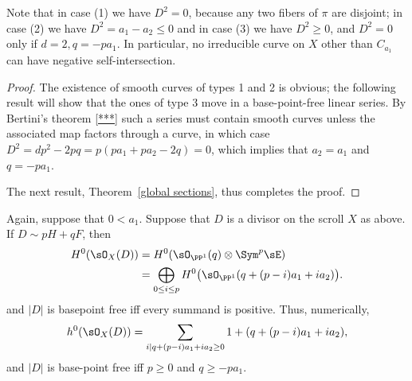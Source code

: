 Note that in case (1) we have $D^{2} = 0$, because any two fibers of $\pi$ are disjoint; in case (2) we have $D^{2}= a_{1}-a_{2}\leq 0$ and in case (3) we have $D^{2}\geq 0$, and $D^2=0$ only if
$d=2, q = -pa_1$. In particular, no irreducible curve
on $X$ other than $C_{a_1}$ can have negative self-intersection.

\begin{proof}
The existence of smooth curves of types 1 and 2 is obvious; the following result will show that
the ones of type 3 move in a base-point-free linear series. By Bertini's theorem \ref{***} such a series must contain smooth curves unless the associated map factors through a curve, in which case $D^2 = dp^2-2pq = p(pa_1+pa_2 -2 q) = 0$, which implies that $a_2=a_1$ and $q= -pa_1$.

The next result, Theorem~\ref{global sections}, thus completes the proof.
\end{proof}

\begin{theorem}\label{global sections} Again, suppose that $0<a_{1}$.
Suppose that $D$ is a divisor on the scroll $X$ as above. If $D \sim pH+qF$, then 
\begin{align*}
 H^{0}(\sO_{X}(D)) &= H^{0}(\sO_{\PP^{1}}(q) \otimes \Sym^{p} \sE)\\
 &= 
\bigoplus_{0\leq i\leq p}H^{0}\bigl(\sO_{\PP^{1}}(q + (p-i)a_{1}+i a_{2})\bigr).
\end{align*}
and $|D|$ is basepoint free iff every summand is positive.
Thus, numerically,
$$
h^{0}(\sO_{X}(D)) = 
\sum_{i \mid q+(p-i)a_{1}+i a_{2} \geq 0}1+(q + (p-i)a_{1}+i a_{2}),
$$
and
$|D|$ is base-point free iff $p\geq 0$ and $q\geq -pa_{1}$.
\end{theorem}

